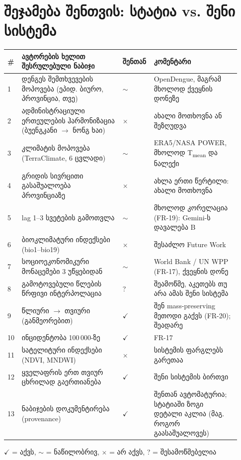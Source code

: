 \documentclass[11pt,a4paper]{article}
\begin{document}
\section{შეჯამება შენთვის: სტატია vs. შენი სისტემა}

\begin{longtable}{@{}p{0.05\linewidth}p{0.42\linewidth}p{0.10\linewidth}p{0.36\linewidth}@{}}
\toprule
\textbf{\#} & \textbf{ავტორების ხელით შესრულებული ნაბიჯი} & \textbf{შენთან} & \textbf{კომენტარი}\\
\midrule
1 & დენგეს შემთხვევების მოპოვება (ეპიდ. ბიურო, პროვინცია, თვე) & $\sim$ & OpenDengue, მაგრამ მხოლოდ ქვეყნის დონეზე\\
2 & ადმინისტრაციული ერთეულების ჰარმონიზაცია (ბუენგკანი $
\rightarrow$ ნონგ ხაი) & $\times$ & ახალი მოთხოვნა ან შეზღუდვა\\
3 & კლიმატის მოპოვება (TerraClimate, 6 ცვლადი) & $\sim$ & ERA5/NASA POWER, მხოლოდ T\textsubscript{mean} და ნალექი\\
4 & გრიდის სივრცითი გასაშუალოება პროვინციაზე & $\times$ & ახლა ერთი წერტილი: ახალი მოთხოვნა\\
5 & lag 1--3 სვეტების გამოთვლა & $\sim$ & მხოლოდ კორელაცია (FR-19): Gemini-ს დავალება B\\
6 & ბიოკლიმატური ინდექსები (bio1--bio19) & $\times$ & შესაძლო Future Work\\
7 & სოციოეკონომიკური მონაცემები 3 უწყებიდან & $\sim$ & World Bank / UN WPP (FR-17), ქვეყნის დონე\\
8 & გამოტოვებული წლების წრფივი ინტერპოლაცია & ? & შეამოწმე, აკეთებს თუ არა ამას შენი სისტემა\\
9 & წლიური $
\rightarrow$ თვიური (განმეორებით) & $\checkmark$ & შენ mass-preserving მეთოდი გაქვს (FR-20); შეადარე\\
10 & ინციდენტობა 100\,000-ზე & $\checkmark$ & FR-17\\
11 & სატელიტური ინდექსები (NDVI, MNDWI) & $\times$ & სისტემის ფარგლებს გარეთაა\\
12 & ყველაფრის ერთ თვიურ ცხრილად გაერთიანება & $\checkmark$ & შენი სისტემის ბირთვი\\
13 & ნაბიჯების დოკუმენტირება (provenance) & $\checkmark$ & შენთან ავტომატურია; სტატიაში ზოგი დეტალი აკლია (მაგ. როგორ გაასაშუალოვეს)\\
\bottomrule
\end{longtable}
{\small $\checkmark$ = აქვს, $\sim$ = ნაწილობრივ, $\times$ = არ აქვს, ? = შესამოწმებელია}
\end{document}
